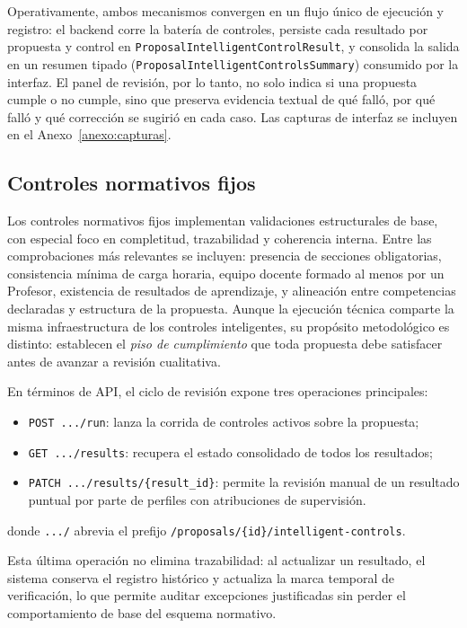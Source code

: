 Operativamente, ambos mecanismos convergen en un flujo único de ejecución y
registro: el backend corre la batería de controles, persiste cada resultado por
propuesta y control en \texttt{ProposalIntelligentControlResult}, y consolida la
salida en un resumen tipado
(\texttt{ProposalIntelligentControlsSummary}) consumido por la interfaz.
El panel de revisión, por lo tanto, no solo indica si una propuesta cumple o
no cumple, sino que preserva evidencia textual de qué falló, por qué falló y
qué corrección se sugirió en cada caso. Las capturas de interfaz se incluyen en
el Anexo~\ref{anexo:capturas}.

\subsection{Controles normativos fijos}
\label{subsec:controles_normativos}

Los controles normativos fijos implementan validaciones estructurales de base,
con especial foco en completitud, trazabilidad y coherencia interna. Entre las
comprobaciones más relevantes se incluyen: presencia de secciones obligatorias,
consistencia mínima de carga horaria, equipo docente formado al menos por un Profesor, existencia de resultados de
aprendizaje, y alineación entre competencias declaradas y estructura de la
propuesta. Aunque la ejecución técnica comparte la misma infraestructura de los
controles inteligentes, su propósito metodológico es distinto: establecen el
\textit{piso de cumplimiento} que toda propuesta debe satisfacer antes de
avanzar a revisión cualitativa.

En términos de API, el ciclo de revisión expone tres operaciones principales:
\begin{itemize}[noitemsep, topsep=2pt]
    \item \texttt{POST .../run}: lanza la corrida de controles activos sobre
      la propuesta;
    \item \texttt{GET .../results}: recupera el estado consolidado de todos
      los resultados;
    \item \texttt{PATCH .../results/\{result\_id\}}: permite la revisión manual
      de un resultado puntual por parte de perfiles con atribuciones de
      supervisión.
\end{itemize}
donde \texttt{.../} abrevia el prefijo
\texttt{/proposals/}\allowbreak\texttt{\{id\}/intelligent-controls}.

Esta última operación no elimina trazabilidad: al actualizar un resultado, el
sistema conserva el registro histórico y actualiza la marca temporal de
verificación, lo que permite auditar excepciones justificadas sin perder el
comportamiento de base del esquema normativo.

